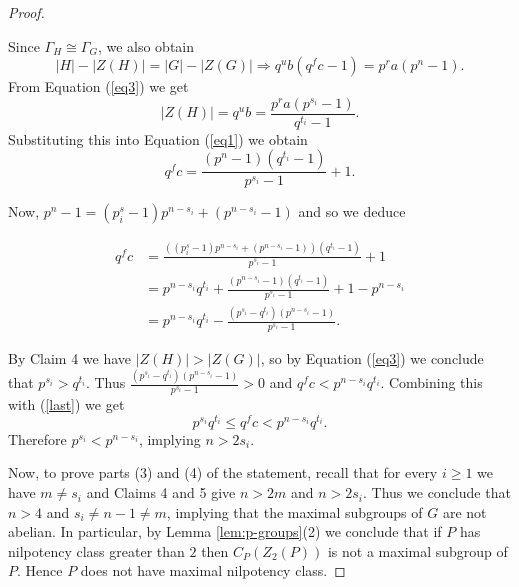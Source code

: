 \documentclass[10pt,a4paper]{amsart}
\begin{document}
\begin{proof}
\begin{description}
Since $\Gamma_H \cong \Gamma_G$, we also obtain
\begin{equation}\label{eq1} |H| - |Z(H)| = |G| - |Z(G)| \Longrightarrow 
q^{u}b(q^fc - 1) = p^{r}a(p^{n} - 1). \end{equation}
From Equation (\ref{eq3}) we get
\[ |Z(H)| = q^ub = \frac{p^{r}a(p^{s_i}- 1)}{q^{t_i} - 1}.\]
Substituting this into Equation (\ref{eq1}) we obtain
\[ q^fc = \frac{(p^{n}- 1)(q^{t_i} - 1)}{p^{s_i}- 1} + 1. \]

Now, $p^n - 1 = (p^s_i - 1)p^{n-s_i} +(p^{n-s_i} - 1)$ and so we deduce  

\[\begin{aligned} q^fc &= \frac{((p^s_i - 1)p^{n-s_i} +(p^{n-s_i} - 1))(q^{t_i} - 1)}{p^{s_i}- 1} + 1 
\\ &= p^{n-s_i}q^{t_i}  + \frac{(p^{n-s_i} - 1)(q^{t_i} - 1)}{p^{s_i}- 1} + 1 - p^{n-s_i}
\\ &= p^{n-s_i}q^{t_i} - \frac{(p^{s_i}-q^{t_i})(p^{n-s_i}-1)}{p^{s_i} -1}.
\end{aligned} \]



By Claim 4 we have $|Z(H)| > |Z(G)|$, so by Equation (\ref{eq3}) we conclude that $p^{s_i} > q^{t_i}$. Thus $\frac{(p^{s_i}-q^{t_i})(p^{n-s_i}-1)}{p^{s_i} -1} > 0$ and $q^fc < p^{n-s_i}q^{t_i}$. Combining this with (\ref{last}) we get
\[ p^{s_i}q^{t_i} \leq  q^fc < p^{n-s_i}q^{t_i}.\]
Therefore $p^{s_i} < p^{n-s_i}$, implying $n > 2s_i$.
\end{description}

Now, to prove parts (3) and (4) of the statement, recall that for every $i\geq 1$ we have $m \neq s_i$ and Claims 4 and 5 give $n > 2m$ and $n > 2s_i$. Thus we conclude that $n >4$ and $s_i \neq n-1 \neq m$, implying that the maximal subgroups of $G$ are not abelian. In particular, by Lemma \ref{lem:p-groups}(2) we conclude that if $P$ has nilpotency class greater than $2$ then $C_P(Z_2(P))$ is not a maximal subgroup of $P$. Hence $P$ does not have maximal nilpotency class.



\end{proof}
\end{document}
